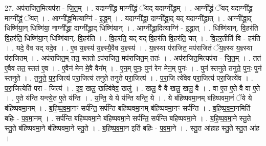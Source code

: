 \documentclass[17pt]{extarticle}
\begin{document}
27. अप॑राजित॒मित्यप॑रा - जि॒त॒म् । . यदाग्नी᳚द्ध्र॒ माग्नी᳚द्ध्रं॒ ॅयद् यदाग्नी᳚द्ध्रम् । . आग्नी᳚द्ध्रं॒ ॅयद् यदाग्नी᳚द्ध्र॒ माग्नी᳚द्ध्रं॒ ॅयत् । . आग्नी᳚द्ध्र॒मित्याग्नि॑ - इ॒द्ध्र॒म् । . यदाग्नी᳚द्ध्रा॒ दाग्नी᳚द्ध्रा॒द् यद् यदाग्नी᳚द्ध्रात् । . आग्नी᳚द्ध्रा॒द् धिष्णि॑या॒न् धिष्णि॑या॒ नाग्नी᳚द्ध्रा॒ दाग्नी᳚द्ध्रा॒द् धिष्णि॑यान् । . आग्नी᳚द्ध्रा॒दित्याग्नि॑ - इ॒द्ध्रा॒त् । . धिष्णि॑यान्. वि॒हर॑ति वि॒हर॑ति॒ धिष्णि॑या॒न् धिष्णि॑यान्. वि॒हर॑ति । . वि॒हर॑ति॒ यद् यद् वि॒हर॑ति वि॒हर॑ति॒ यत् । . वि॒हर॒तीति॑ वि - हर॑ति । . यदे॒ वैव यद् यदे॒व । . ए॒व य॒ज्ञ्स्य॑ य॒ज्ञ्स्यै॒वैव य॒ज्ञ्स्य॑ । . य॒ज्ञ्स्या प॑राजित॒ मप॑राजितं ॅय॒ज्ञ्स्य॑ य॒ज्ञ्स्या प॑राजितम् । . अप॑राजित॒म् तत॒ स्ततो ऽप॑राजित॒ मप॑राजित॒म् ततः॑ । . अप॑राजित॒मित्यप॑रा - जि॒त॒म् । . तत॑ ए॒वैव तत॒ स्तत॑ ए॒व । . ए॒वैन॑ मेन मे॒वै वैन᳚म् । . ए॒न॒म् पुनः॒ पुन॑ रेन मेन॒म् पुनः॑ । . पुन॑ स्तनुते तनुते॒ पुनः॒ पुन॑ स्तनुते । . त॒नु॒ते॒ प॒रा॒जित्य॑ परा॒जित्य॑ तनुते तनुते परा॒जित्य॑ । . प॒रा॒जि त्ये॑वेव परा॒जित्य॑ परा॒जित्ये॑व । . प॒रा॒जित्येति॑ परा - जित्य॑ । . इ॒व॒ खलु॒ खल्वि॑वेव॒ खलु॑ । . खलु॒ वै वै खलु॒ खलु॒ वै । . वा ए॒त ए॒ते वै वा ए॒ते । . ए॒ते य॑न्ति यन्त्ये॒त ए॒ते य॑न्ति । . य॒न्ति॒ ये ये य॑न्ति यन्ति॒ ये । . ये ब॑हिष्पवमा॒नम् ब॑हिष्पवमा॒नं ॅये ये ब॑हिष्पवमा॒नम् । . ब॒हि॒ष्प॒व॒मा॒नꣳ सर्प॑न्ति॒ सर्प॑न्ति बहिष्पवमा॒नम् ब॑हिष्पवमा॒नꣳ सर्प॑न्ति । . ब॒हि॒ष्प॒व॒मा॒नमिति॑ बहिः - प॒व॒मा॒नम् । . सर्प॑न्ति बहिष्पवमा॒ने ब॑हिष्पवमा॒ने सर्प॑न्ति॒ सर्प॑न्ति बहिष्पवमा॒ने । . ब॒हि॒ष्प॒व॒मा॒ने स्तु॒ते स्तु॒ते ब॑हिष्पवमा॒ने ब॑हिष्पवमा॒ने स्तु॒ते । . ब॒हि॒ष्प॒व॒मा॒न इति॑ बहिः - प॒व॒मा॒ने । . स्तु॒त आ॑हाह स्तु॒ते स्तु॒त आ॑ह । \newline
\end{document}

